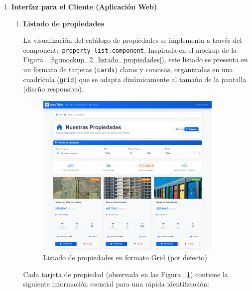 \begin{enumerate}

    \item \textbf{Interfaz para el Cliente (Aplicación Web)}

    \begin{enumerate}

        \item \textbf{Listado de propiedades}

        La visualización del catálogo de propiedades se implementa a través del componente \texttt{property-list.component}. Inspirada en el mockup de la Figura ~\ref{fig:mockup_2_listado_propiedades}), este listado se presenta en un formato de tarjetas (\texttt{cards}) claras y concisas, organizadas en una cuadrícula (\texttt{grid}) que se adapta dinámicamente al tamaño de la pantalla (diseño responsivo).

        \begin{figure}[H]
            \begin{center}
                \includegraphics[width = 0.90\textwidth]{Figuras/listadopropiedades.png}
            \end{center}
            \caption{\label{fig:listadopropiedades} Listado de propiedades en formato Grid (por defecto)}
        \end{figure}

        Cada tarjeta de propiedad (observada en las Figura ~\ref{fig:listadopropiedades}) contiene la siguiente información esencial para una rápida identificación:


\end{enumerate}
\end{enumerate}
